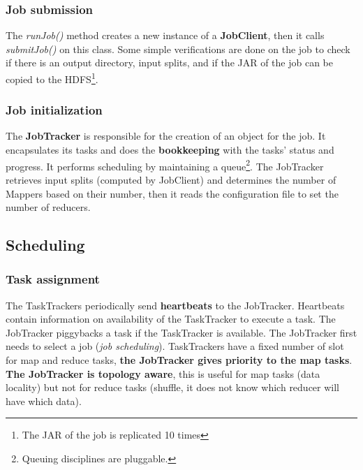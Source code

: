 	\subsubsection{Job submission}
		\par
		The \textit{runJob()} method creates a new instance of a \textbf{JobClient}, then it calls \textit{submitJob()} on this class.
		\newline
		Some simple verifications are done on the job to check if there is an output directory, input splits, and if the JAR of the job can be copied to the HDFS\footnote{The JAR of the job is replicated 10 times}.
	\subsubsection{Job initialization}
		\par
		The \textbf{JobTracker} is responsible for the creation of an object for the job. It encapsulates its tasks and does the \textbf{bookkeeping} with the tasks' status and progress.
		\newline
		It performs scheduling by maintaining a queue\footnote{Queuing disciplines are pluggable.}.
		\newline
		The JobTracker retrieves input splits (computed by JobClient) and determines the number of Mappers based on their number, then it reads the configuration file to set the number of reducers.
	\subsection{Scheduling}
		\subsubsection{Task assignment}
			\par
			The TaskTrackers periodically send \textbf{heartbeats} to the JobTracker. Heartbeats contain information on availability of the TaskTracker to execute a task. The JobTracker piggybacks a task if the TaskTracker is available.
			\newline
			The JobTracker first needs to select a job (\textit{job scheduling}). TaskTrackers have a fixed number of slot for map and reduce tasks, \textbf{the JobTracker gives priority to the map tasks}.
			\newline
			\textbf{The JobTracker is topology aware}, this is useful for map tasks (data locality) but not for reduce tasks (shuffle, it does not know which reducer will have which data).
